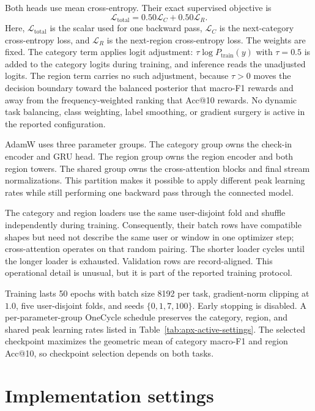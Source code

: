 Both heads use mean cross-entropy. Their exact supervised objective is
\begin{equation}
    \mathcal{L}_{\mathrm{total}}
    =0.50\mathcal{L}_{C}+0.50\mathcal{L}_{R}.
    \label{eq:apx-joint-loss}
\end{equation}
Here, $\mathcal{L}_{\mathrm{total}}$ is the scalar used for one backward pass,
$\mathcal{L}_{C}$ is the next-category cross-entropy loss, and
$\mathcal{L}_{R}$ is the next-region cross-entropy loss. The weights are fixed.
The category term applies logit adjustment: $\tau\log P_{\mathrm{train}}(y)$ with
$\tau=0.5$ is added to the category logits during training, and inference reads the
unadjusted logits. The region term carries no such adjustment, because $\tau>0$ moves the
decision boundary toward the balanced posterior that macro-F1 rewards and away from the
frequency-weighted ranking that Acc@10 rewards. No dynamic task balancing, class
weighting, label smoothing, or gradient surgery is active in the reported configuration.

AdamW uses three parameter groups. The category group owns the check-in encoder and
GRU head. The region group owns the region encoder and both region towers. The
shared group owns the cross-attention blocks and final stream normalizations. This
partition makes it possible to apply different peak learning rates while still
performing one backward pass through the connected model.

The category and region loaders use the same user-disjoint fold and shuffle
independently during training. Consequently, their batch rows have compatible
shapes but need not describe the same user or window in one optimizer step;
cross-attention operates on that random pairing. The shorter loader cycles until
the longer loader is exhausted. Validation rows are record-aligned. This
operational detail is unusual, but it is part of the reported training protocol.

Training lasts 50 epochs with batch size 8192 per task, gradient-norm clipping at
$1.0$, five user-disjoint folds, and seeds $\{0,1,7,100\}$. Early stopping is
disabled. A per-parameter-group OneCycle schedule preserves the category, region,
and shared peak learning rates listed in Table~\ref{tab:apx-active-settings}. The
selected checkpoint maximizes the geometric mean of category macro-F1 and region
Acc@10, so checkpoint selection depends on both tasks.

\section{Implementation settings}
\label{sec:apx-methods-specification}

